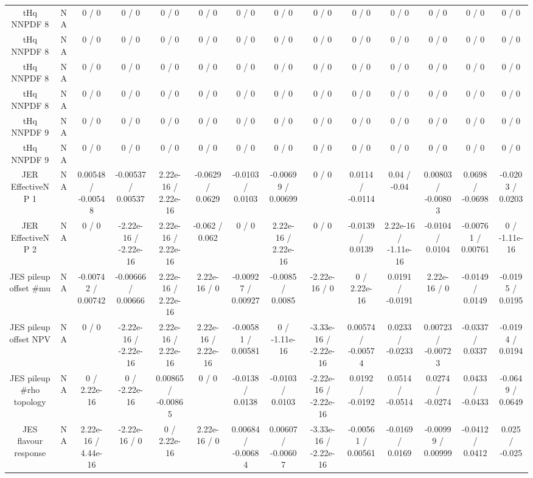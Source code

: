 \documentclass[10pt]{article}
\begin{document}
\begin{table}[htbp]
\begin{center}
\begin{tabular}{|c|c|c|c|c|c|c|c|c|c|c|c|c|c|}
  tHq NNPDF 8 &    NA    & 0 / 0 & 0 / 0 & 0 / 0 & 0 / 0 & 0 / 0 & 0 / 0 & 0 / 0 & 0 / 0 & 0 / 0 & 0 / 0 & 0 / 0 & 0 / 0 \\ 
  tHq NNPDF 8 &    NA    & 0 / 0 & 0 / 0 & 0 / 0 & 0 / 0 & 0 / 0 & 0 / 0 & 0 / 0 & 0 / 0 & 0 / 0 & 0 / 0 & 0 / 0 & 0 / 0 \\ 
  tHq NNPDF 8 &    NA    & 0 / 0 & 0 / 0 & 0 / 0 & 0 / 0 & 0 / 0 & 0 / 0 & 0 / 0 & 0 / 0 & 0 / 0 & 0 / 0 & 0 / 0 & 0 / 0 \\ 
  tHq NNPDF 8 &    NA    & 0 / 0 & 0 / 0 & 0 / 0 & 0 / 0 & 0 / 0 & 0 / 0 & 0 / 0 & 0 / 0 & 0 / 0 & 0 / 0 & 0 / 0 & 0 / 0 \\ 
  tHq NNPDF 9 &    NA    & 0 / 0 & 0 / 0 & 0 / 0 & 0 / 0 & 0 / 0 & 0 / 0 & 0 / 0 & 0 / 0 & 0 / 0 & 0 / 0 & 0 / 0 & 0 / 0 \\ 
  tHq NNPDF 9 &    NA    & 0 / 0 & 0 / 0 & 0 / 0 & 0 / 0 & 0 / 0 & 0 / 0 & 0 / 0 & 0 / 0 & 0 / 0 & 0 / 0 & 0 / 0 & 0 / 0 \\ 
  JER EffectiveNP 1 &    NA    & 0.00548 / -0.00548 & -0.00537 / 0.00537 & 2.22e-16 / 2.22e-16 & -0.0629 / 0.0629 & -0.0103 / 0.0103 & -0.00699 / 0.00699 & 0 / 0 & 0.0114 / -0.0114 & 0.04 / -0.04 & 0.00803 / -0.00803 & 0.0698 / -0.0698 & -0.0203 / 0.0203 \\ 
  JER EffectiveNP 2 &    NA    & 0 / 0 & -2.22e-16 / -2.22e-16 & 2.22e-16 / 2.22e-16 & -0.062 / 0.062 & 0 / 0 & 2.22e-16 / 2.22e-16 & 0 / 0 & -0.0139 / 0.0139 & 2.22e-16 / -1.11e-16 & -0.0104 / 0.0104 & -0.00761 / 0.00761 & 0 / -1.11e-16 \\ 
  JES pileup offset #mu &    NA    & -0.00742 / 0.00742 & -0.00666 / 0.00666 & 2.22e-16 / 2.22e-16 & 2.22e-16 / 0 & -0.00927 / 0.00927 & -0.0085 / 0.0085 & -2.22e-16 / 0 & 0 / 2.22e-16 & 0.0191 / -0.0191 & 2.22e-16 / 0 & -0.0149 / 0.0149 & -0.0195 / 0.0195 \\ 
  JES pileup offset NPV &    NA    & 0 / 0 & -2.22e-16 / -2.22e-16 & 2.22e-16 / 2.22e-16 & 2.22e-16 / 2.22e-16 & -0.00581 / 0.00581 & 0 / -1.11e-16 & -3.33e-16 / -2.22e-16 & 0.00574 / -0.00574 & 0.0233 / -0.0233 & 0.00723 / -0.00723 & -0.0337 / 0.0337 & -0.0194 / 0.0194 \\ 
  JES pileup #rho topology &    NA    & 0 / 2.22e-16 & 0 / -2.22e-16 & 0.00865 / -0.00865 & 0 / 0 & -0.0138 / 0.0138 & -0.0103 / 0.0103 & -2.22e-16 / -2.22e-16 & 0.0192 / -0.0192 & 0.0514 / -0.0514 & 0.0274 / -0.0274 & 0.0433 / -0.0433 & -0.0649 / 0.0649 \\ 
  JES flavour response &    NA    & 2.22e-16 / 4.44e-16 & -2.22e-16 / 0 & 0 / 2.22e-16 & 2.22e-16 / 0 & 0.00684 / -0.00684 & 0.00607 / -0.00607 & -3.33e-16 / -2.22e-16 & -0.00561 / 0.00561 & -0.0169 / 0.0169 & -0.00999 / 0.00999 & -0.0412 / 0.0412 & 0.025 / -0.025 \\ 

\end{tabular}
\end{center}
\end{table}
\end{document}
